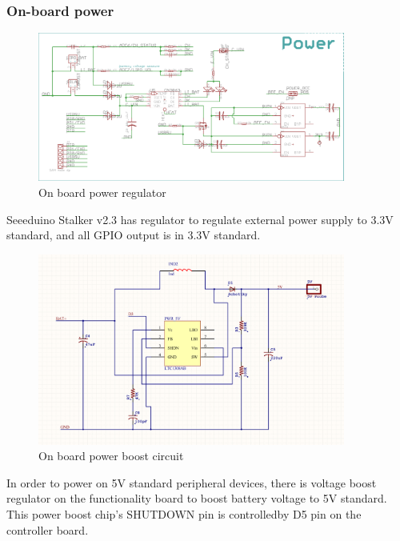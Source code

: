  



  \subsubsection{On-board power}
    \label{power block}
    
    \begin{figure}[ht]
    \centering
    \includegraphics[width=0.9\textwidth]{3v3power_circuit.png}
    \caption{\label{fig:3v3power_circuit}On board power regulator}
    \end{figure}  
    Seeeduino Stalker v2.3 has regulator to regulate external power supply to 3.3V standard, and all GPIO output is in 3.3V standard. 


    \begin{figure}[H]
    \centering
    \includegraphics[width=0.9\textwidth]{power_circuit.png}
    \caption{\label{fig:power_circuit}On board power boost circuit}
    \end{figure}
    In order to power on 5V standard peripheral devices, there is voltage boost regulator on the functionality board to boost battery voltage to 5V standard. This power boost chip's SHUTDOWN pin is controlled\footnotemark by D5 pin on the controller board. \\
    

